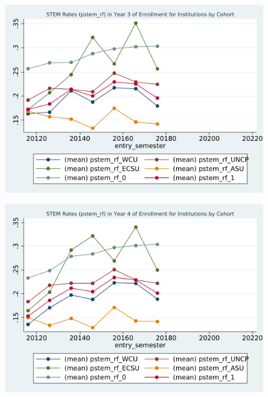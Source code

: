 \begin{figure}[h!]
\begin{centering}
\includegraphics[scale=1]{"figures/pstem_rf_by_entry_3_INSTITUTION_STEM"}
\end{centering}
\end{figure}
\newpage
\begin{figure}[h!]
\begin{centering}
\includegraphics[scale=1]{"figures/pstem_rf_by_entry_4_INSTITUTION_STEM"}
\end{centering}
\end{figure}
\newpage
